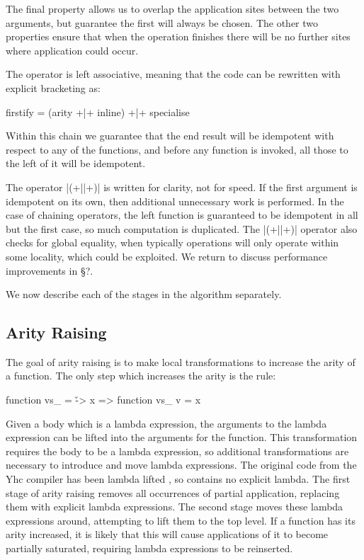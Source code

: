 \documentclass[preprint]{sigplanconf}
\begin{document}
The final property allows us to overlap the application sites between the two arguments, but guarantee the first will always be chosen. The other two properties ensure that when the operation finishes there will be no further sites where application could occur.

The operator is left associative, meaning that the code can be rewritten with explicit bracketing as:

\begin{code}
firstify = (arity +|+ inline) +|+ specialise
\end{code}

Within this chain we guarantee that the end result will be idempotent with respect to any of the functions, and before any function is invoked, all those to the left of it will be idempotent.

The operator |(+||+)| is written for clarity, not for speed. If the first argument is idempotent on its own, then additional unnecessary work is performed. In the case of chaining operators, the left function is guaranteed to be idempotent in all but the first case, so much computation is duplicated. The |(+||+)| operator also checks for global equality, when typically operations will only operate within some locality, which could be exploited. We return to discuss performance improvements in \S?.

We now describe each of the stages in the algorithm separately.

\subsection{Arity Raising}

The goal of arity raising is to make local transformations to increase the arity of a function. The only step which increases the arity is the rule:

\begin{code}
function vs_ = \v -> x
    => function vs_ v = x
\end{code}

Given a body which is a lambda expression, the arguments to the lambda expression can be lifted into the arguments for the function. This transformation requires the body to be a lambda expression, so additional transformations are necessary to introduce and move lambda expressions. The original code from the Yhc compiler has been lambda lifted \cite{lambda_lift}, so contains no explicit lambda. The first stage of arity raising removes all occurrences of partial application, replacing them with explicit lambda expressions. The second stage moves these lambda expressions around, attempting to lift them to the top level. If a function has its arity increased, it is likely that this will cause applications of it to become partially saturated, requiring lambda expressions to be reinserted.
\end{document}
